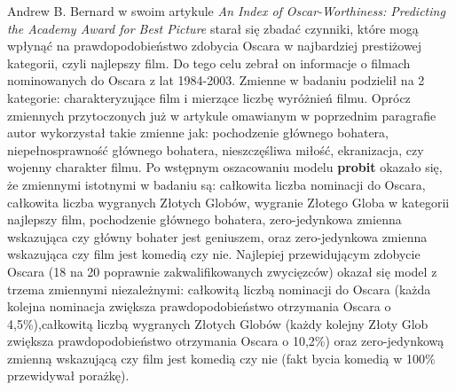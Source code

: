 Andrew B. Bernard w swoim artykule \textit{An Index of Oscar-Worthiness: Predicting the Academy Award for Best Picture} \cite{bernard05} starał się zbadać czynniki, które mogą wpłynąć na prawdopodobieństwo zdobycia Oscara w najbardziej prestiżowej kategorii, czyli najlepszy film. Do tego celu zebrał on informacje o filmach nominowanych do Oscara z lat 1984-2003. Zmienne w badaniu podzielił na 2 kategorie: charakteryzujące film i mierzące liczbę wyróżnień filmu. Oprócz zmiennych przytoczonych już w artykule omawianym w poprzednim paragrafie autor wykorzystał takie zmienne jak: pochodzenie głównego bohatera, niepełnosprawność głównego bohatera, nieszczęśliwa miłość, ekranizacja, czy wojenny charakter filmu. Po wstępnym oszacowaniu modelu \textbf{probit} okazało się, że zmiennymi istotnymi w badaniu są: całkowita liczba nominacji do Oscara, całkowita liczba wygranych Złotych Globów, wygranie Złotego Globa w kategorii najlepszy film, pochodzenie głównego bohatera, zero-jedynkowa zmienna wskazująca czy główny bohater jest geniuszem, oraz zero-jedynkowa zmienna wskazująca czy film jest komedią czy nie. Najlepiej przewidującym zdobycie Oscara (18 na 20 poprawnie zakwalifikowanych zwycięzców) okazał się model z trzema zmiennymi niezależnymi: całkowitą liczbą nominacji do Oscara (każda kolejna nominacja zwiększa prawdopodobieństwo otrzymania Oscara o 4,5\%),całkowitą liczbą wygranych Złotych Globów (każdy kolejny Złoty Glob zwiększa prawdopodobieństwo otrzymania Oscara o 10,2\%) oraz zero-jedynkową zmienną wskazującą czy film jest komedią czy nie (fakt bycia komedią w 100\% przewidywał porażkę). 

